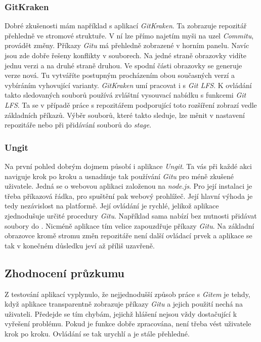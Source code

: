         \subsubsection{GitKraken~}
        Dobré zkušenosti mám například s aplikací \emph{GitKraken}. Ta zobrazuje repozitář přehledně ve stromové struktuře. V ní lze přímo najetím myši na uzel \emph{Commitu}, provádět změny. Příkazy \emph{Gitu} má přehledně zobrazené v horním panelu. Navíc jsou zde dobře řešeny konflikty v souborech. Na jedné straně obrazovky vidíte jednu verzi a na druhé straně druhou. Ve spodní části obrazovky se generuje verze nová. Tu vytváříte postupným procházením obou současných verzí a vybíráním vyhovující varianty. \emph{GitKraken} umí pracovat i s \emph{Git LFS}. K ovládání takto sledovaných souborů používá zvláštní vysouvací nabídku s funkcemi \emph{Git LFS}. Ta se v případě práce s repozitářem podporující toto rozšíření zobrazí vedle základních příkazů. Výběr souborů, které takto sleduje, lze měnit v nastavení repozitáře nebo při přidávání souborů do \emph{stage}.

        \subsubsection{Ungit~}
        Na první pohled dobrým dojmem působí i aplikace \emph{Ungit}. Ta vás při každé akci naviguje krok po kroku a usnadňuje tak používání \emph{Gitu} pro méně zkušené uživatele. Jedná se o webovou aplikaci založenou na \emph{node.js}. Pro její instalaci je třeba příkazová řádka, pro spuštění pak webový prohlížeč. Její hlavní výhoda je tedy nezávislost na platformě. Její ovládání je rychlé, jelikož aplikace zjednodušuje určité procedury \emph{Gitu}. Například sama nabízí  bez nutnosti přidávat soubory do . Nicméně aplikace tím velice zapouzdřuje příkazy \emph{Gitu}. Na základní obrazovce kromě stromu změn repozitáře není další ovládací prvek a aplikace se tak v konečném důsledku jeví až příliš uzavřeně.

    \subsection{Zhodnocení průzkumu}
    Z testování aplikací vyplynulo, že nejjednodušší způsob práce s \emph{Gitem} je tehdy, když aplikace transparentně zobrazuje příkazy \emph{Gitu} a jejich použití nechá na uživateli. Předejde se tím chybám, jejichž hlášení nejsou vždy dostačující k vyřešení problému. Pokud je funkce dobře zpracována, není třeba vést uživatele krok po kroku. Ovládání se tak urychlí a je stále přehledné.

